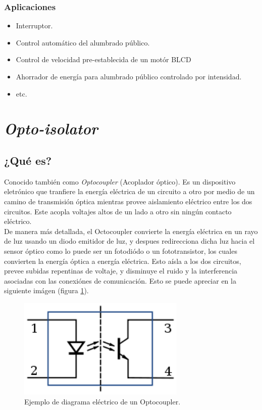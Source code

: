 \documentclass[letterpaper, 12pt]{article}
\begin{document}
\begin{justify}
        \subsubsection{Aplicaciones}
        \begin{itemize}
            \item Interruptor.
            \item Control automático del alumbrado público.
            \item Control de velocidad pre-establecida de un motór BLCD
            \item Ahorrador de energía para alumbrado público controlado por intensidad.
            \item etc.
        \end{itemize}
        \section{\emph{Opto-isolator}}
        \subsection{¿Qué es?}
        Conocido también como \emph{Optocoupler} (Acoplador óptico). Es un dispositivo eletrónico que tranfiere la energía eléctrica de un circuito a otro
        por medio de un camino de transmisión óptica mientras provee aislamiento eléctrico entre los dos circuitos. Este acopla voltajes altos de un lado a otro sin ningún contacto
        eléctrico.\\
        De manera más detallada, el Octocoupler convierte la energía eléctrica en un rayo de luz usando un diodo emitidor de luz, y despues redirecciona dicha luz hacia el sensor óptico como lo puede ser
        un fotodiódo o un fototransistor, los cuales convierten la energía óptica a energía eléctrica. Esto aísla a los dos circuitos, prevee subidas repentinas de voltaje, y disminuye el ruido y la interferencia
        asociadas con las conexiónes de comunicación. Esto se puede apreciar en la siguiente imágen (figura \ref{fig:Optothingy}). 
        \begin{figure}[H]
            \centering
            \includegraphics[width=8cm]{Optothingy.png}
            \caption{Ejemplo de diagrama eléctrico de un Optocoupler.}
            \label{fig:Optothingy}
        \end{figure}

\end{justify}
\end{document}
